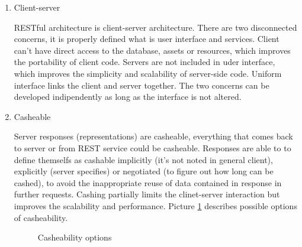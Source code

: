 \begin{description}
\begin{enumerate}
\item Client-server

RESTful architecture is client-server architecture. There are two disconnected concerns, it is properly defined what is user interface and services. Client can’t have direct access to the database, assets or resources, which improves the portability of client code. Servers are not included in uder interface, which improves the simplicity and scalability of server-side code. Uniform interface links the client and server together. The two concerns can be developed indipendently as long as the interface is not altered. 

\item Casheable

Server responses (representations) are casheable, everything that comes back to server or from REST service could be casheable. Responses are able to to define themselfs as cashable implicitly (it’s not noted in general client), explicitly (server specifies) or negotiated (to figure out how long can be cashed), to avoid the inappropriate reuse of data contained in response in further requests. Cashing partially limits the clinet-server interaction but improves the scalability and performance. 
Picture \ref{fig:casheability} describes possible options of casheability.


\begin{figure}[htp] 
\caption{Casheability options}
\label{fig:casheability}
\end{figure} 


\end{enumerate}
\end{description}
